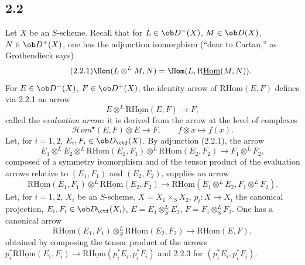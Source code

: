 \subsection*{2.2}
Let $X$ be an $S$-scheme. Recall that for $L\in\ob D^{-}(X)$, $M\in\ob D(X)$, $N\in\ob D^{+}(X)$, one has the adjunction isomorphism (``dear to Cartan,'' as Grothendieck says)
\begin{equation}\tag{2.2.1}
\Hom(L\otimes^{L}M,N)=\Hom(L,\mathrm{R}\underline{\mathrm{Hom}}(M,N)).
\end{equation}
For $E\in\ob D^{-}(X)$, $F\in\ob D^{+}(X)$, the identity arrow of $\mathrm{R}\underline{\mathrm{Hom}}(E,F)$ defines via 2.2.1 an arrow
\begin{equation}\tag{2.2.2}
E\otimes^{L}\mathrm{R}\underline{\mathrm{Hom}}(E,F)\longrightarrow F,
\end{equation}
called the \emph{evaluation arrow}: it is derived from the arrow at the level of complexes
\[
\mathcal Hom^{\bullet}(E,F)\otimes E\longrightarrow F,
\qquad f\otimes x\longmapsto f(x).
\]
Let, for $i=1,2$, $E_i,F_i\in\ob D_{\ctf}(X)$. By adjunction (2.2.1), the arrow
\[
E_1\otimes^{L}E_2\otimes^{L}\mathrm{R}\underline{\mathrm{Hom}}(E_1,F_1)\otimes^{L}\mathrm{R}\underline{\mathrm{Hom}}(E_2,F_2)\longrightarrow F_1\otimes^{L}F_2,
\]
composed of a symmetry isomorphism and of the tensor product of the evaluation arrows relative to $(E_1,F_1)$ and $(E_2,F_2)$, supplies an arrow
\begin{equation}\tag{2.2.3}
\mathrm{R}\underline{\mathrm{Hom}}(E_1,F_1)\otimes^{L}\mathrm{R}\underline{\mathrm{Hom}}(E_2,F_2)\longrightarrow\mathrm{R}\underline{\mathrm{Hom}}(E_1\otimes^{L}E_2,F_1\otimes^{L}F_2).
\end{equation}
Let, for $i=1,2$, $X_i$ be an $S$-scheme, $X=X_1\times_SX_2$, $p_i:X\to X_i$ the canonical projection, $E_i,F_i\in\ob D_{\ctf}(X_i)$, $E=E_1\otimes^{L}_{S}E_2$, $F=F_1\otimes^{L}_{S}F_2$. One has a canonical arrow
\begin{equation}\tag{2.2.4}
\mathrm{R}\underline{\mathrm{Hom}}(E_1,F_1)\otimes^{L}_{S}\mathrm{R}\underline{\mathrm{Hom}}(E_2,F_2)\longrightarrow\mathrm{R}\underline{\mathrm{Hom}}(E,F),
\end{equation}
obtained by composing the tensor product of the arrows $p_i^{*}\mathrm{R}\underline{\mathrm{Hom}}(E_i,F_i)\to\mathrm{R}\underline{\mathrm{Hom}}(p_i^{*}E_i,p_i^{*}F_i)$ and 2.2.3 for $(p_i^{*}E_i,p_i^{*}F_i)$.

